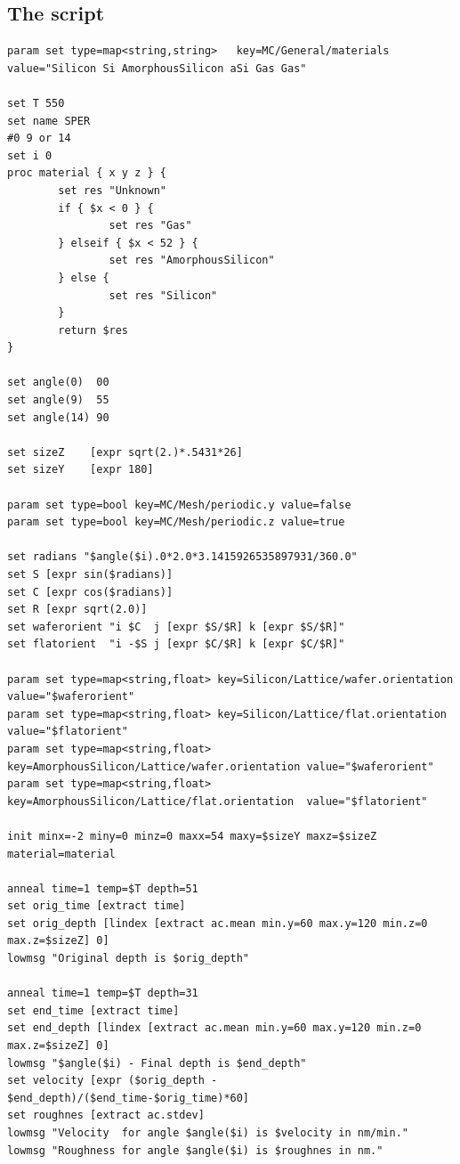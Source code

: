\subsection{The script}

\begin{lstlisting}
param set type=map<string,string>   key=MC/General/materials value="Silicon Si AmorphousSilicon aSi Gas Gas"

set T 550
set name SPER
#0 9 or 14
set i 0
proc material { x y z } {
        set res "Unknown"
        if { $x < 0 } {
                set res "Gas"
        } elseif { $x < 52 } {
                set res "AmorphousSilicon"
        } else {
                set res "Silicon"
        }
        return $res
}

set angle(0)  00
set angle(9)  55
set angle(14) 90

set sizeZ    [expr sqrt(2.)*.5431*26]
set sizeY    [expr 180]

param set type=bool key=MC/Mesh/periodic.y value=false
param set type=bool key=MC/Mesh/periodic.z value=true

set radians "$angle($i).0*2.0*3.1415926535897931/360.0"
set S [expr sin($radians)]
set C [expr cos($radians)]
set R [expr sqrt(2.0)]
set waferorient "i $C  j [expr $S/$R] k [expr $S/$R]"
set flatorient  "i -$S j [expr $C/$R] k [expr $C/$R]"

param set type=map<string,float> key=Silicon/Lattice/wafer.orientation value="$waferorient"
param set type=map<string,float> key=Silicon/Lattice/flat.orientation  value="$flatorient" 
param set type=map<string,float> key=AmorphousSilicon/Lattice/wafer.orientation value="$waferorient"
param set type=map<string,float> key=AmorphousSilicon/Lattice/flat.orientation  value="$flatorient" 

init minx=-2 miny=0 minz=0 maxx=54 maxy=$sizeY maxz=$sizeZ material=material

anneal time=1 temp=$T depth=51
set orig_time [extract time]  
set orig_depth [lindex [extract ac.mean min.y=60 max.y=120 min.z=0 max.z=$sizeZ] 0]
lowmsg "Original depth is $orig_depth"

anneal time=1 temp=$T depth=31
set end_time [extract time]   
set end_depth [lindex [extract ac.mean min.y=60 max.y=120 min.z=0 max.z=$sizeZ] 0]
lowmsg "$angle($i) - Final depth is $end_depth"
set velocity [expr ($orig_depth - $end_depth)/($end_time-$orig_time)*60]
set roughnes [extract ac.stdev]
lowmsg "Velocity  for angle $angle($i) is $velocity in nm/min."
lowmsg "Roughness for angle $angle($i) is $roughnes in nm."

\end{lstlisting}

